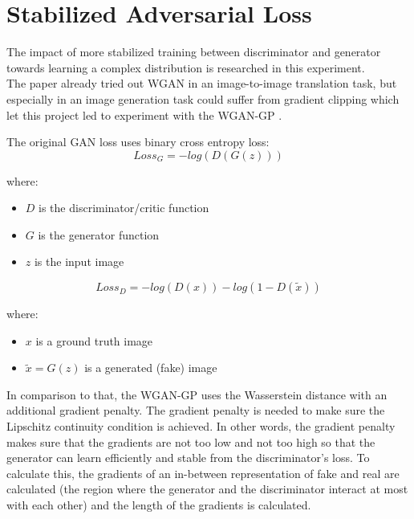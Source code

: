 		
	
	\section{Stabilized Adversarial Loss}
	\label{sec:experiments-stabilized_adversarial_loss}
		The impact of more stabilized training between discriminator and generator towards learning a complex distribution is researched in this experiment.\\
		The paper  already tried out WGAN in an image-to-image translation task, but especially in an image generation task could suffer from gradient clipping which let this project led to experiment with the WGAN-GP \cite{gulrajani_improved_2017}.
		
		The original GAN loss uses binary cross entropy loss:
		\begin{equation}
			Loss_G = -log( D( G(z) ) ) 
		\end{equation}
		
		\noindent where:
		\begin{itemize}[itemsep=1mm, parsep=0pt]
			\item $D$ is the discriminator/critic function
			\item $G$ is the generator function
			\item $z$ is the input image
		\end{itemize}
		
		\begin{equation}
			Loss_D = -log(D(x)) - log(1 - D(\tilde{x}))
		\end{equation}
		
		\noindent where:
		\begin{itemize}[itemsep=1mm, parsep=0pt]
			\item $x$ is a ground truth image
			\item $\tilde{x} = G(z)$ is a generated (fake) image
		\end{itemize}
		
		In comparison to that, the WGAN-GP uses the Wasserstein distance with an additional gradient penalty. The gradient penalty is needed to make sure the Lipschitz continuity condition is achieved. In other words, the gradient penalty makes sure that the gradients are not too low and not too high so that the generator can learn efficiently and stable from the discriminator's loss. To calculate this, the gradients of an in-between representation of fake and real are calculated (the region where the generator and the discriminator interact at most with each other) and the length of the gradients is calculated. 
		
